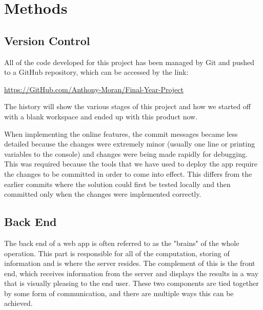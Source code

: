 \chapter{Methods}
\label{chapter2}

\section{Version Control}
\label{sec:VersionControl}
All of the code developed for this project has been managed by Git and pushed to a GitHub repository, which can be accessed by the link:

\begin{center}
    \url{https://GitHub.com/Anthony-Moran/Final-Year-Project}
\end{center}

The history will show the various stages of this project and how we started off with a blank workspace and ended up with this product now.

When implementing the online features, the commit messages became less detailed because the changes were extremely minor (usually one line or printing variables to the console) and changes were being made rapidly for debugging. This was required because the tools that we have used to deploy the app require the changes to be committed in order to come into effect. This differs from the earlier commits where the solution could first be tested locally and then committed only when the changes were implemented correctly.

\section{Back End}

The back end of a web app is often referred to as the "brains" of the whole operation. This part is responsible for all of the computation, storing of information and is where the server resides. The complement of this is the front end, which receives information from the server and displays the results in a way that is visually pleasing to the end user. These two components are tied together by some form of communication, and there are multiple ways this can be achieved.

